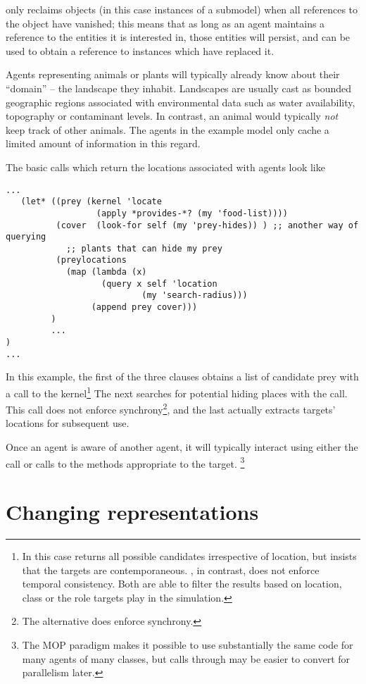 \Scheme only reclaims objects (in this case instances of a submodel)
when all references to the object have vanished; this means that as
long as an agent maintains a reference to the entities it is
interested in, those entities will persist, and can be used to obtain
a reference to instances which have replaced it.

Agents representing animals or plants will typically already know
about their ``domain'' -- the landscape they inhabit.  Landscapes are
usually cast as bounded geographic regions associated with
environmental data such as water availability, topography or
contaminant levels. In contrast, an animal would typically \emph{not}
keep track of other animals.  The agents in the example model only
cache a limited amount of information in this regard.

The basic calls which return the locations associated with agents look
like
\begin{verbatim}
...
   (let* ((prey (kernel 'locate 
                  (apply *provides-*? (my 'food-list))))
          (cover  (look-for self (my 'prey-hides)) ) ;; another way of querying
            ;; plants that can hide my prey
          (preylocations 
            (map (lambda (x) 
                   (query x self 'location 
                           (my 'search-radius))) 
                 (append prey cover)))
         )
         ...
)
...
\end{verbatim}
In this example, the first of the three clauses obtains a list of
candidate prey with a call to the kernel\footnote{In this case
   returns all possible candidates irrespective of
  location, but insists that the targets are
  contemporaneous. , in contrast, does not enforce
  temporal consistency. Both are able to filter the results based on
  location, class or the role targets play in the simulation.}  The
next searches for potential hiding places with the 
call. This call does not enforce synchrony\footnote{The alternative
   does enforce synchrony.}, and the last actually
extracts targets' locations for subsequent use.

Once an agent is aware of another agent, it will typically interact
using either the  call or calls to the methods
appropriate to the target. \footnote{The MOP paradigm makes it possible to use
substantially the same code for many agents of many classes, but calls
through  may be easier to convert for parallelism later.}

\section{Changing representations}

